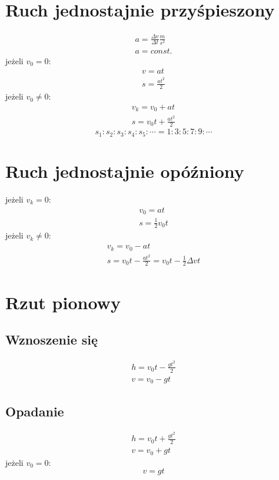     \section{Ruch jednostajnie przyśpieszony}
      \begin{gather}
        a = \frac{\Delta v}{\Delta t} \unit{\frac{m}{s^2}}\\
        a = const.
      \end{gather}
      jeżeli $v_0 = 0$:
      \begin{gather}
        v = at\\
        s = \frac{at^2}{2}
      \end{gather}
      jeżeli $v_0 \ne 0$:
      \begin{gather}
        v_k = v_0 + at\\
        s = v_0t + \frac{at^2}{2}
      \end{gather}
      \begin{equation}
        s_1:s_2:s_3:s_4:s_5:\cdots = 1:3:5:7:9:\cdots
      \end{equation}
    \section{Ruch jednostajnie opóźniony}
      jeżeli $v_k = 0$:
      \begin{gather}
        v_0 = at\\
        s = \frac{1}{2}v_0t
      \end{gather}
      jeżeli $v_k \ne 0$:
      \begin{gather}
        v_k = v_0 - at\\
        s = v_0t - \frac{at^2}{2} = v_0t - \frac{1}{2}\Delta vt
      \end{gather}
    \section{Rzut pionowy}
      \subsection{Wznoszenie się}
        \begin{gather}
          h = v_0t - \frac{gt^2}{2}\\
          v = v_0 - gt
        \end{gather}
      \subsection{Opadanie}
        \begin{gather}
          h = v_0t + \frac{gt^2}{2}\\
          v = v_0 + gt
        \end{gather}
        jeżeli $v_0 = 0$:
        \begin{equation}
          v = gt
        \end{equation}
